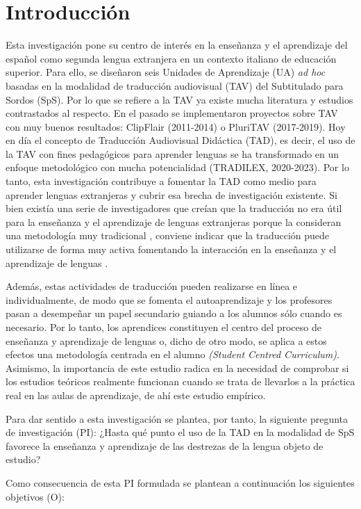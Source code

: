 \documentclass[spanish]{textolivre}
\begin{document}
\section{Introducción}\label{sec-intro}
Esta investigación pone su centro de interés en la enseñanza y el aprendizaje del español como segunda lengua extranjera en un contexto italiano de educación superior. Para ello, se diseñaron seis Unidades de Aprendizaje (UA) \textit{ad hoc} basadas en la modalidad de traducción audiovisual (TAV) del Subtitulado para Sordos (SpS). Por lo que se refiere a la TAV ya existe mucha literatura y estudios contrastados al respecto. En el pasado se implementaron proyectos sobre TAV con muy buenos resultados: ClipFlair (2011-2014) o PluriTAV (2017-2019). Hoy en día el concepto de Traducción Audiovisual Didáctica (TAD), es decir, el uso de la TAV con fines pedagógicos para aprender lenguas se ha transformado en un enfoque metodológico con mucha potencialidad (TRADILEX, 2020-2023). Por lo tanto, esta investigación contribuye a fomentar la TAD como medio para aprender lenguas extranjeras y cubrir esa brecha de investigación existente. Si bien existía una serie de investigadores que creían que la traducción no era útil para la enseñanza y el aprendizaje de lenguas extranjeras porque la consideran una metodología muy tradicional \cite{lado1964}, conviene indicar que la traducción puede utilizarse de forma muy activa fomentando la interacción en la enseñanza y el aprendizaje de lenguas \cite{fraga-castrillon2024}. 

Además, estas actividades de traducción pueden realizarse en línea e individualmente, de modo que se fomenta el autoaprendizaje y los profesores pasan a desempeñar un papel secundario guiando a los alumnos sólo cuando es necesario. Por lo tanto, los aprendices constituyen el centro del proceso de enseñanza y aprendizaje de lenguas o, dicho de otro modo, se aplica a estos efectos una metodología centrada en el alumno \textit{(Student Centred Curriculum)}. Asimismo, la importancia de este estudio radica en la necesidad de comprobar si los estudios teóricos realmente funcionan cuando se trata de llevarlos a la práctica real en las aulas de aprendizaje, de ahí este estudio empírico. 

Para dar sentido a esta investigación se plantea, por tanto, la siguiente pregunta de investigación (PI): ¿Hasta qué punto el uso de la TAD en la modalidad de SpS favorece la enseñanza y aprendizaje de las destrezas de la lengua objeto de estudio?

Como consecuencia de esta PI formulada se plantean a continuación los siguientes objetivos (O):
\end{document}
